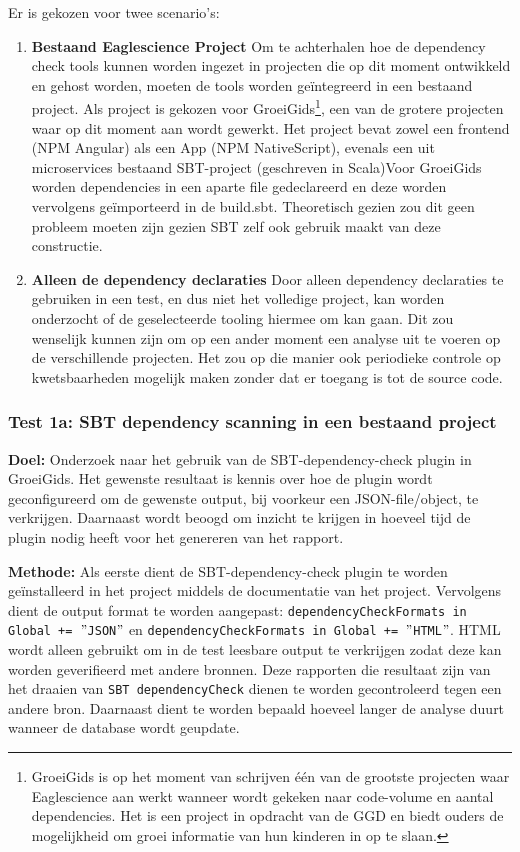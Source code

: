 Er is gekozen voor twee scenario's:
\begin{enumerate}
    \item \textbf{Bestaand Eaglescience Project} Om te achterhalen hoe de dependency check tools kunnen worden ingezet in projecten die op dit moment ontwikkeld en gehost worden, moeten de tools worden geïntegreerd in een bestaand project. Als project is gekozen voor GroeiGids\footnote{GroeiGids is op het moment van schrijven één van de grootste projecten waar Eaglescience aan werkt wanneer wordt gekeken naar code-volume en aantal dependencies. Het is een project in opdracht van de GGD en biedt ouders de mogelijkheid om groei informatie van hun kinderen in op te slaan.}, een van de grotere projecten waar op dit moment aan wordt gewerkt. Het project bevat zowel een frontend (NPM Angular) als een App (NPM NativeScript), evenals een uit microservices bestaand SBT-project (geschreven in Scala)Voor GroeiGids worden dependencies in een aparte file gedeclareerd en deze worden vervolgens geïmporteerd in de build.sbt. Theoretisch gezien zou dit geen probleem moeten zijn gezien SBT zelf ook gebruik maakt van deze constructie.

    \item \textbf{Alleen de dependency declaraties} Door alleen dependency declaraties te gebruiken in een test, en dus niet het volledige project, kan worden onderzocht of de geselecteerde tooling hiermee om kan gaan. Dit zou wenselijk kunnen zijn om op een ander moment een analyse uit te voeren op de verschillende projecten. Het zou op die manier ook periodieke controle op kwetsbaarheden mogelijk maken zonder dat er toegang is tot de source code.
\end{enumerate}

\subsubsection{Test 1a: SBT dependency scanning in een bestaand project}
\textbf{Doel:} Onderzoek naar het gebruik van de SBT-dependency-check\citep{Albuch:z.d.} plugin in GroeiGids. Het gewenste resultaat is kennis over hoe de plugin wordt geconfigureerd om de gewenste output, bij voorkeur een JSON-file/object, te verkrijgen. Daarnaast wordt beoogd om inzicht te krijgen in hoeveel tijd de plugin nodig heeft voor het genereren van het rapport.

\textbf{Methode:} Als eerste dient de SBT-dependency-check plugin te worden geïnstalleerd in het project middels de documentatie van het project. Vervolgens dient de output format te worden aangepast: \texttt{dependencyCheckFormats in Global += $"$JSON$"$}
en \texttt{dependencyCheckFormats in Global += $"$HTML$"$}. HTML wordt alleen gebruikt om in de test leesbare output te verkrijgen zodat deze kan worden geverifieerd met andere bronnen. Deze rapporten die resultaat zijn van het draaien van \texttt{SBT dependencyCheck} dienen te worden gecontroleerd tegen een andere bron. Daarnaast dient te worden bepaald hoeveel langer de analyse duurt wanneer de database wordt geupdate.

